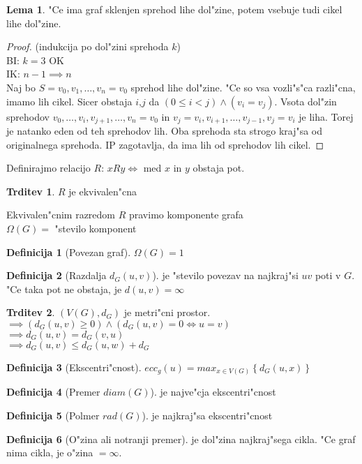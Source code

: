 \documentclass{article}
\theoremstyle{definition}
\newtheorem{definition}{Definicija}[section]
\newtheorem{lemma}{Lema}[section]
\newtheorem{claim}{Trditev}[section]
\begin{document}
	\begin{lemma}\label{lem:1}
		"Ce ima graf sklenjen sprehod lihe dol"zine, potem vsebuje tudi cikel lihe dol"zine.
		\begin{proof}
			(indukcija po dol"zini sprehoda $k$)\\
			BI: $k=3$ OK \\ 
			IK: $n-1 \implies n$ \\ 
			Naj bo $S=v_0,v_1,\ldots,v_n=v_0$ sprehod lihe dol"zine. "Ce so vsa vozli"s"ca razli"cna, imamo lih cikel. Sicer obstaja $i$,$j$ da $(0 \leq i < j) \land (v_i = v_j)$. Vsota dol"zin sprehodov $v_0, \ldots, v_i, v_{j+1}, \ldots, v_n = v_0$ in $v_j = v_i, v_{i+1},\ldots,v_{j-1},v_j=v_i$ je liha. Torej je natanko eden od teh sprehodov lih. Oba sprehoda sta strogo kraj"sa od originalnega sprehoda. IP zagotavlja, da ima lih od sprehodov lih cikel.
		\end{proof}
	\end{lemma}

	
	Definirajmo relacijo $R$: $xRy \iff$ med $x$ in $y$ obstaja pot.
	\begin{claim}
		$R$ je ekvivalen"cna
	\end{claim}
	Ekvivalen"cnim razredom $R$ pravimo komponente grafa \\ 
	$\Omega(G) =$ "stevilo komponent \\ 
	\begin{definition}[Povezan graf]
		$\Omega(G) = 1$
	\end{definition}
	\begin{definition}[Razdalja $d_G(u,v)$]
		je "stevilo povezav na najkraj"si $uv$ poti v $G$. "Ce taka pot ne obstaja, je $d(u,v) = \infty$
	\end{definition}
	
	\begin{claim}
		$(V(G), d_G)$ je metri"cni prostor. \\
			$\implies (d_G(u,v) \geq 0) \land (d_G(u,v) = 0 \iff u = v)$ \\ 
			$\implies d_G(u,v) = d_G(v,u)$ \\ 
			$\implies d_G(u,v) \leq d_G(u,w) + d_G$
	\end{claim}
	
	\begin{definition}[Ekscentri"cnost]
		$ecc_g(u) = max_{x \in V(G)}\left\lbrace d_G(u,x)\right\rbrace$
	\end{definition}
	\begin{definition}[Premer $diam(G)$]
		je najve"cja ekscentri"cnost
	\end{definition}
	\begin{definition}[Polmer $rad(G)$]
		je najkraj"sa ekscentri"cnost
	\end{definition}
	\begin{definition}[O"zina ali notranji premer]
		je dol"zina najkraj"sega cikla. "Ce graf nima cikla, je o"zina $= \infty$.
	\end{definition} 
	
\end{document}
